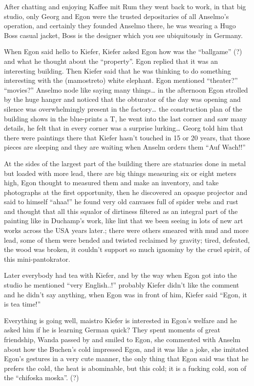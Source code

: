 \documentclass[smalldemyvopaper,11pt,twoside,onecolumn,openright,extrafontsizes]{memoir}
\begin{document}
After chatting and enjoying Kaffee mit Rum they went back to work, in that big studio, only Georg and Egon were the trusted depositaries of all Anselmo’s operation, and certainly they founded Anselmo there, he was wearing a Hugo Boss casual jacket, Boss is the designer which you see ubiquitously in Germany. 

When Egon said hello to Kiefer, Kiefer asked Egon how was the “ballgame” (?) and what he thought about the “property”. Egon replied that it was an interesting building. Then Kiefer said that he was thinking to do something interesting with the (mamostreto) white elephant. Egon mentioned “theater?” “movies?” Anselmo node like saying many things… in the afternoon Egon strolled by the huge hanger and noticed that the obturator of the day was opening and silence was overwhelmingly present in the factory… the construction plan of the building shows in the blue-prints a T, he went into the last corner and saw many details, he felt that in every corner was a surprise lurking… Georg told him that there were paintings there that Kiefer hasn’t touched in 15 or 20 years, that those pieces are sleeping and they are waiting when Anselm orders them “Auf Wach!!”

At the sides of the largest part of the building there are statuaries done in metal but loaded with more lead, there are big things measuring six or eight meters high, Egon thought to measured them and make an inventory, and take photographs at the first opportunity, then he discovered an opaque projector and said to himself “ahaa!” he found very old canvases full of spider webs and rust and thought that all this squalor of dirtiness filtered as an integral part of the painting like in Duchamp’s work, like lint that we been seeing in lots of new art works across the USA years later.; there were others smeared with mud and more lead, some of them were bended and twisted reclaimed by gravity; tired, defeated, the wood was broken, it couldn’t support so much ignominy by the cruel spirit, of this mini-pantokrator.

Later everybody had tea with Kiefer, and by the way when Egon got into the studio he mentioned “very English..!” probably Kiefer didn’t like the comment and he didn’t say anything, when Egon was in front of him, Kiefer said “Egon, it is tea time!” 

Everything is going well, maistro Kiefer is interested in Egon’s welfare and he asked him if he is learning German quick? They spent moments of great friendship, Wanda passed by and smiled to Egon, she commented with Anselm about how the Buchen’s cold impressed Egon, and it was like a joke, she imitated Egon’s gestures in a very cute manner, the only thing that Egon said was that he prefers the cold, the heat is abominable, but this cold; it is a fucking cold, son of the “chifoska moska”. (?)
\end{document}
